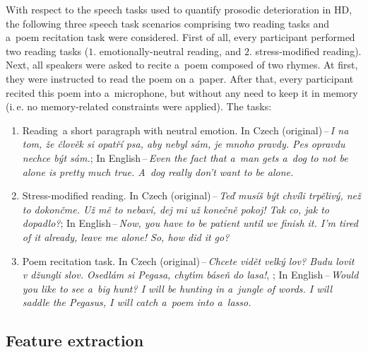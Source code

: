 With respect to the speech tasks used to quantify prosodic deterioration in HD, the following three speech task scenarios comprising two reading tasks and a~poem recitation task were considered. First of all, every participant performed two reading tasks ($1$. emotionally-neutral reading, and $2$. stress-modified reading). Next, all speakers were asked to recite a~poem composed of two rhymes. At first, they were instructed to read the poem on a~paper. After that, every participant recited this poem into a~microphone, but without any need to keep it in memory (i.\,e. no memory-related constraints were applied). The tasks:
\begin{enumerate}

	\item Reading~a short paragraph with neutral emotion. 
	In Czech (original)\,--\,\textit{I na tom, \v{z}e \v{c}lov\v{e}k si opat\v{r}\'{i} psa, aby nebyl s\'{a}m, je mnoho pravdy. Pes opravdu nechce b\'{y}t s\'{a}m.}; In English\,--\,\textit{Even the fact that a~man gets a~dog to not be alone is pretty much true. A~dog really don't want to be alone.}

	\item Stress-modified reading. 
	In Czech (original)\,--\,\textit{Te\v{d} mus\'{i}\v{s} b\'{y}t chv\'{i}li trp\v{e}liv\'{y}, ne\v{z} to dokon\v{c}\textbf{}me. U\v{z} m\v{e} to nebav\'{i}, dej mi u\v{z} kone\v{c}n\v{e} pokoj! Tak co, jak to dopadlo?}; In English\,--\,\textit{Now, you have to be patient until we finish it. I'm tired of it already, leave me alone! So, how did it go?}

	\item Poem recitation task. 
	In Czech (original)\,--\,\textit{Chcete vid\v{e}t velk\'{y} lov? Budu lovit v d\v{z}ungli slov. Osedl\'{a}m si Pegasa, chyt\'{\i}m b\'{a}se\v{n} do lasa!}, ; In English\,--\,\textit{Would you like to see a~big hunt? I will be hunting in a~jungle of words. I will saddle the Pegasus, I will catch a~poem into a~lasso.}
\end{enumerate}

\subsection{Feature extraction}
\label{ch4_3_2}

